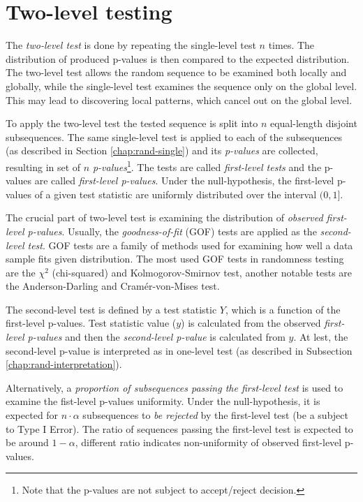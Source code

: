 \documentclass[
  digital,     %
  oneside,     %
  nosansbold,  %
  nocolorbold, %
  nolof,         %
  nolot,         %
]{fithesis4}
\begin{document}
\section{Two-level testing} \label{chap:rand-two_level}

The \emph{two-level test} is done by repeating the single-level test $n$ times. The distribution of produced p-values is then compared to the expected distribution. The two-level test allows the random sequence to be examined both locally and globally, while the single-level test examines the sequence only on the global level. This may lead to discovering local patterns, which cancel out on the global level. \cite[p. 7]{tu01_paper}

To apply the two-level test the tested sequence is split into $n$ equal-length disjoint subsequences. The same single-level test is applied to each of the subsequences (as described in Section \ref{chap:rand-single}) and its \emph{p-values} are collected, resulting in set of $n$ \emph{p-values}\footnote{Note that the p-values are not subject to accept/reject decision.}. The tests are called \emph{first-level tests} and the p-values are called \emph{first-level p-values}. Under the null-hypothesis, the first-level p-values of a given test statistic are uniformly distributed over the interval $(0,1]$. \cite[p. 14]{bad_day} 


The crucial part of two-level test is examining the distribution of \emph{observed first-level p-values}. Usually, the \emph{goodness-of-fit} (GOF) tests are applied as the \emph{second-level test}. \cite[p. 6]{tu01_paper} GOF tests are a family of methods used for examining how well a data sample fits given distribution. \cite[p. 1]{GOF-techniques} The most used GOF tests in randomness testing are the $\chi^2$ (chi-squared) and Kolmogorov-Smirnov test, another notable tests are the Anderson-Darling and Cramér-von-Mises test. \cite[p. 14]{bad_day}

The second-level test is defined by a test statistic $Y$, which is a function of the first-level p-values. Test statistic value ($y$) is calculated from the observed \emph{first-level p-values} and then the \emph{second-level p-value} is calculated from $y$. At lest, the second-level p-value is interpreted as in one-level test (as described in Subsection \ref{chap:rand-interpretation}). 

Alternatively, a \emph{proportion of subsequences passing the first-level test} is used to examine the fist-level p-values uniformity. Under the null-hypothesis, it is expected for $n\cdot\alpha$ subsequences to \emph{be rejected} by the first-level test (be a subject to Type I Error). The ratio of sequences passing the first-level test is expected to be around $1-\alpha$, different ratio indicates non-uniformity of observed first-level p-values. \cite[p. 4-2]{nist_special}
\end{document}
